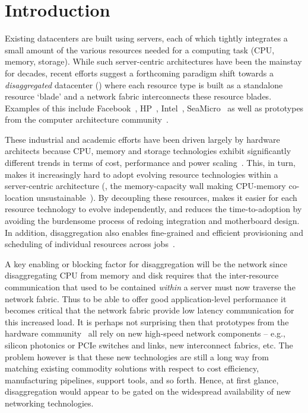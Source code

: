 \vspace{-0.1in}
\section{Introduction}
\label{sec:intro}
\vspace{-0.05in}
Existing datacenters are built using servers, each of which tightly integrates a small amount of the various resources needed for a computing task (CPU, memory, storage). While such server-centric architectures have been the mainstay for decades, recent efforts suggest a forthcoming paradigm shift towards a {\em disaggregated} datacenter (\dis) where each resource type is built as a standalone resource `blade' and a network fabric interconnects these resource blades. Examples of this include Facebook~\cite{fdr}, HP~\cite{hptm}, Intel~\cite{rsa}, SeaMicro~\cite{seamicro} as well as prototypes from the computer architecture community~\cite{firebox, sonuma, ddcHwDesign1}. 

These industrial and academic efforts have been driven largely by hardware architects because CPU, memory and storage technologies exhibit significantly different trends in terms of cost, performance and power scaling~\cite{memristors,nvram,reg-ex-hardware,gpus}. This, in turn, makes it increasingly hard to adopt evolving resource technologies within a server-centric architecture (\eg, the memory-capacity wall making CPU-memory co-location unsustainable~\cite{ddcHwDesign1}). By decoupling these resources, \dis makes it easier for each resource technology to evolve independently, and reduces the time-to-adoption by avoiding the burdensome process of redoing integration and motherboard design. In addition, disaggregation also enables fine-grained and efficient provisioning and scheduling of individual resources across jobs~\cite{hotnets}. 


A key enabling or blocking factor for disaggregation will be the network since disaggregating CPU from memory and disk requires that the inter-resource communication that used to be contained \emph{within} a server must now traverse the network fabric. 
Thus to be able to offer good application-level performance it becomes critical that the network fabric provide low latency communication for this increased load. 
It is perhaps not surprising then that prototypes from the hardware community~\cite{rsa, fdr, hptm, seamicro, firebox, sonuma, ddcHwDesign1} all rely on new high-speed network components -- e.g., silicon photonics or PCIe switches and links, new interconnect fabrics, etc.
The problem however is that these new technologies are still a long way from matching existing commodity solutions with respect to cost efficiency,  manufacturing pipelines, support tools, and so forth. Hence, at first glance, disaggregation would appear to be gated on the widespread availability of new networking technologies. 

